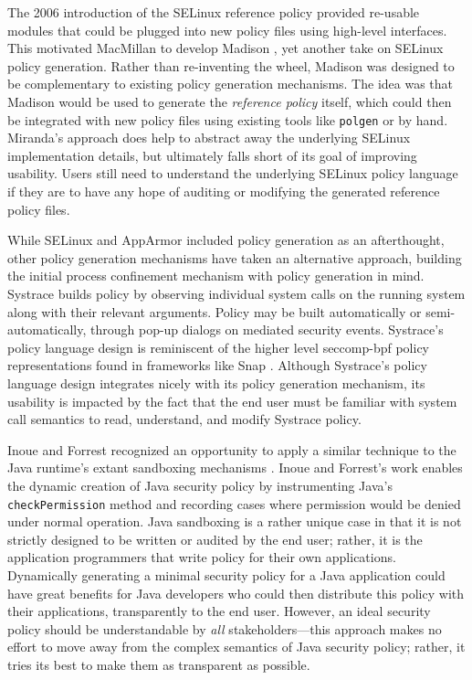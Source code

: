 \documentclass[dvipsnames, 12pt]{article}
\begin{document}
The 2006 introduction of the SELinux reference policy \cite{pebenito2006_refpol}
provided re-usable modules that could be plugged into new policy files using
high-level interfaces. This motivated MacMillan to develop Madison
\cite{macmillan07_madison}, yet another take on SELinux policy generation.
Rather than re-inventing the wheel, Madison was designed to be complementary to
existing policy generation mechanisms. The idea was that Madison would be used
to generate the \textit{reference policy} itself, which could then be integrated
with new policy files using existing tools like \texttt{polgen} or by hand.
Miranda's approach does help to abstract away the underlying SELinux
implementation details, but ultimately falls short of its goal of improving
usability. Users still need to understand the underlying SELinux policy language
if they are to have any hope of auditing or modifying the generated reference
policy files.


While SELinux and AppArmor included policy generation as an afterthought, other
policy generation mechanisms have taken an alternative approach, building the
initial process confinement mechanism with policy generation in mind.
 Systrace
\cite{provos2003_systrace} builds policy by observing individual system calls on
the running system along with their relevant arguments. Policy may be built
automatically or semi-automatically, through pop-up dialogs on mediated security
events. Systrace's policy language design is reminiscent of the higher level
seccomp-bpf policy representations found in frameworks like Snap \cite{snap}.
Although Systrace's policy language design integrates nicely with its policy
generation mechanism, its usability is impacted by the fact that the end user
must be familiar with system call semantics to read, understand, and modify
Systrace policy.

Inoue and Forrest \cite{inoue05_java, inoue05_thesis} recognized an opportunity
to apply a similar technique to the Java runtime's extant sandboxing mechanisms
\cite{gong1993_java2}. Inoue and Forrest's work enables the dynamic creation
of Java security policy by instrumenting Java's \texttt{checkPermission} method
and recording cases where permission would be denied under normal operation.
Java sandboxing is a rather unique case in that it is not strictly designed to
be written or audited by the end user; rather, it is the application programmers
that write policy for their own applications. Dynamically generating a minimal
security policy for a Java application could have great benefits for Java
developers who could then distribute this policy with their applications,
transparently to the end user.  However, an ideal security policy should be
understandable by \textit{all} stakeholders---this approach makes no effort to
move away from the complex semantics of Java security policy; rather, it tries
its best to make them as transparent as possible.
\end{document}
